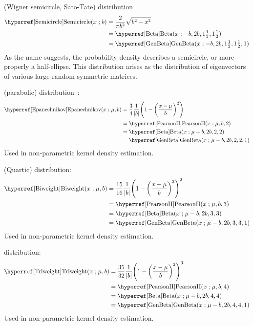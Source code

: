  (Wigner semicircle, Sato-Tate) distribution~\cite{Wigner1955}
\begin{align}
\label{Semicircle}
\opr{Semicircle}(x\given b) &= \frac{2}{\pi b^2} \sqrt{b^2-x^2} \checked \\
& =\opr{Beta}(x\given -b, 2b, 1\tfrac{1}{2}, 1\tfrac{1}{2}) \notag \checked \\
& =\opr{GenBeta}(x\given -b, 2b, 1\tfrac{1}{2}, 1\tfrac{1}{2},1) \notag \checked
\end{align}
As the name suggests, the probability density describes a semicircle, or more properly a half-ellipse. This distribution arises as the distribution of eigenvectors of various large random symmetric matrices. 

 (parabolic) distribution~\cite{Epanechnikov1969a}:
\begin{align}
\label{Epanechnikov}
\opr{Epanechnikov}(x\given \mu, b) 
&= \frac{3}{4} \frac{1}{|b|} \Left(1-\Left(\frac{x-\mu}{b}\Right)^2 \Right) \checked
 \\
& = \opr{PearsonII}(x\given \mu, b, 2) \notag \checked \\
& = \opr{Beta}(x\given \mu-b, 2 b, 2, 2) \notag   \checked \\
& = \opr{GenBeta}(x\given \mu-b, 2b, 2, 2,1) \checked \notag 
\end{align}
Used in non-parametric kernel density estimation.


 (Quartic) distribution:
\begin{align}
\label{Biweight}
\opr{Biweight}(x\given \mu, b) 
&= \frac{15}{16} \frac{1}{|b|} \Left(1-\Left(\frac{x-\mu}{b}\Right)^2 \Right)^2 
\checked
 \\
& = \opr{PearsonII}(x\given \mu, b, 3) \notag  \checked\\
& = \opr{Beta}(x\given \mu-b, 2 b, 3, 3) \notag   \checked \\
& = \opr{GenBeta}(x\given \mu-b, 2b, 3, 3,1)  \notag \checked
\end{align}
Used in non-parametric kernel density estimation.

 distribution:
\begin{align}
\label{Triweight}
\opr{Triweight}(x\given \mu, b) 
&= \frac{35}{32} \frac{1}{|b|} \Left(1-\Left(\frac{x-\mu}{b}\Right)^2 \Right)^3 
\checked
 \\
& = \opr{PearsonII}(x\given \mu, b, 4) \notag  \checked\\
& = \opr{Beta}(x\given \mu-b, 2 b, 4, 4) \notag   \checked \\
& = \opr{GenBeta}(x\given \mu-b, 2b, 4, 4,1)  \notag \checked
\end{align}
Used in non-parametric kernel density estimation.



